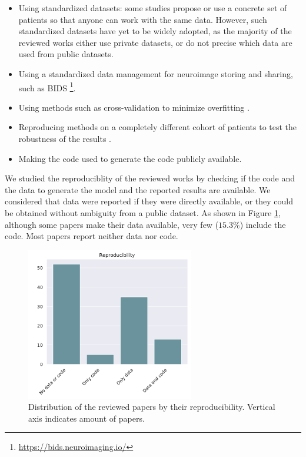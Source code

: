 \begin{itemize}\itemsep7pt
\item Using standardized datasets: some studies \cite{cuingnet,Moradi2015,Sanroma2017,Wyman2013} propose or use a concrete set of patients so that anyone can work with the same data. However, such standardized datasets have yet to be widely adopted, as the majority of the reviewed works either use private datasets, or do not precise which data are used from public datasets.

\item Using a standardized data management for neuroimage storing and sharing, such as BIDS \footnote{\url{https://bids.neuroimaging.io/}}. 

\item Using methods such as cross-validation to minimize overfitting \cite{Yang2018}.

\item Reproducing methods on a completely different cohort of patients to test the robustness of the results \cite{Casanova2018}.

\item Making the code used to generate the code publicly available.
\end{itemize}

We studied the reproduciblity of the reviewed works by checking if the code and the data to generate the model and the reported results are available. We considered that data were reported if they were directly available, or they could be obtained without ambiguity from a public dataset. As shown in Figure \ref{fig:reproduc}, although some papers make their data available, very few ($15.3 \%$) include the code. Most papers report neither data nor code.  \\

\begin{figure}[!htbp]
\centering
\includegraphics[width=0.65\textwidth]{figures/review/Fig10.pdf}
    \caption[Distribution of the reviewed papers by their reproducibility.]{Distribution of the reviewed papers by their reproducibility. Vertical axis indicates amount of papers.}
    \label{fig:reproduc}
\end{figure}

